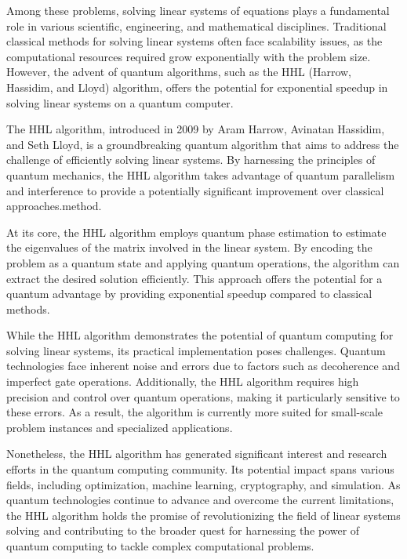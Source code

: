 Among these problems, solving linear systems of equations plays a fundamental role in various scientific, 
engineering, and mathematical disciplines. 
Traditional classical methods for solving linear systems often face scalability issues, as the computational 
resources required grow exponentially with the problem size. 
However, the advent of quantum algorithms, such as the HHL (Harrow, Hassidim, and Lloyd) algorithm, 
offers the potential for exponential speedup in solving linear systems on a quantum computer.

The HHL algorithm, introduced in 2009 by Aram Harrow, Avinatan Hassidim, and Seth Lloyd, is a groundbreaking quantum algorithm that aims to address the challenge of efficiently solving linear systems. 
By harnessing the principles of quantum mechanics, the HHL algorithm takes advantage of quantum parallelism and interference to provide a potentially significant improvement over classical approaches.method.

At its core, the HHL algorithm employs quantum phase estimation to estimate the eigenvalues of the matrix involved in the linear system. 
By encoding the problem as a quantum state and applying quantum operations, the algorithm can extract the desired solution efficiently. 
This approach offers the potential for a quantum advantage by providing exponential speedup compared to classical methods.


While the HHL algorithm demonstrates the potential of quantum computing for solving linear systems, its practical implementation poses challenges. 
Quantum technologies face inherent noise and errors due to factors such as decoherence and imperfect gate operations. 
Additionally, the HHL algorithm requires high precision and control over quantum operations, making it particularly sensitive to these errors. 
As a result, the algorithm is currently more suited for small-scale problem instances and specialized applications.

Nonetheless, the HHL algorithm has generated significant interest and research efforts in the quantum computing community. 
Its potential impact spans various fields, including optimization, machine learning, cryptography, and simulation. 
As quantum technologies continue to advance and overcome the current limitations, the HHL algorithm holds the promise of revolutionizing the field of linear systems solving and contributing to the broader quest for harnessing the power of quantum computing to tackle complex computational problems.